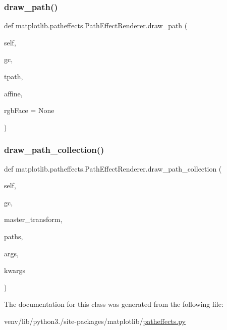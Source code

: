 \subsubsection{\texorpdfstring{draw\+\_\+path()}{draw\_path()}}
{\footnotesize\ttfamily def matplotlib.\+patheffects.\+Path\+Effect\+Renderer.\+draw\+\_\+path (\begin{DoxyParamCaption}\item[{}]{self,  }\item[{}]{gc,  }\item[{}]{tpath,  }\item[{}]{affine,  }\item[{}]{rgb\+Face = {\ttfamily None} }\end{DoxyParamCaption})}

\mbox{\label{classmatplotlib_1_1patheffects_1_1PathEffectRenderer_a5c7e5693aefa235c120791e25698cb65}} 
\subsubsection{\texorpdfstring{draw\+\_\+path\+\_\+collection()}{draw\_path\_collection()}}
{\footnotesize\ttfamily def matplotlib.\+patheffects.\+Path\+Effect\+Renderer.\+draw\+\_\+path\+\_\+collection (\begin{DoxyParamCaption}\item[{}]{self,  }\item[{}]{gc,  }\item[{}]{master\+\_\+transform,  }\item[{}]{paths,  }\item[{}]{args,  }\item[{}]{kwargs }\end{DoxyParamCaption})}



The documentation for this class was generated from the following file\+:\begin{DoxyCompactItemize}
\item 
venv/lib/python3./site-\/packages/matplotlib/\hyperlink{patheffects_8py}{patheffects.\+py}\end{DoxyCompactItemize}
